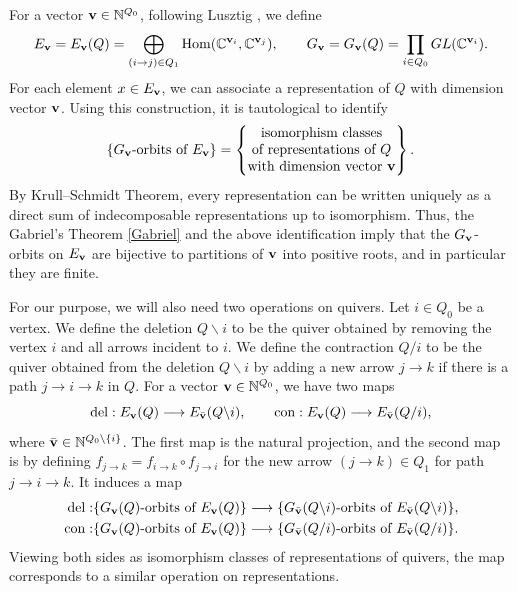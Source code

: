 \documentclass[12pt,reqno]{amsart}
\numberwithin{equation}{section}
\theoremstyle{definition}
\begin{document}
For a vector $\mathbf{v}\in\mathbb{N}^{Q_0}$, following Lusztig \cite[Chapter 9]{Lus}, we define 
$$E_{\mathbf{v}}= E_{\mathbf{v}}(Q)= \bigoplus_{(i\to j)\in Q_1}
\operatorname{Hom}(\mathbb{C}^{\mathbf{v}_{i}},\mathbb{C}^{\mathbf{v}_{j}}),\qquad 
G_{\mathbf{v}} =G_{\mathbf{v}}(Q)= \prod_{i\in Q_0}GL(\mathbb{C}^{\mathbf{v}_i}). $$
For each element $x\in E_{\mathbf{v}}$, we can associate a representation of $Q$ with dimension vector $\mathbf{v}$. Using this construction, it is tautological to identify
$$\{\text{$G_{\mathbf{v}}$-orbits of $E_{\mathbf{v}}$}\}
=\left\{
\begin{matrix}
\text{isomorphism classes}\\
\text{of representations of $Q$}\\
\text{with dimension vector $\mathbf{v}$}
\end{matrix}\right\}.$$
By Krull--Schmidt Theorem, every representation can be written uniquely as a direct sum of indecomposable representations up to isomorphism. 
Thus, the Gabriel's Theorem \ref{Gabriel} and the above identification imply that the $G_{\mathbf{v}}$-orbits on $E_{\mathbf{v}}$ are bijective to partitions of $\mathbf{v}$ into positive roots, and in particular they are finite. 


For our purpose, we will also need two operations on quivers. 
Let $i\in Q_0$ be a vertex. 
We define the deletion $Q\backslash i$ to be the quiver obtained by removing the vertex $i$ and all arrows incident to $i$. 
We define the contraction $Q/i$ to be the quiver obtained from the deletion $Q\backslash i$ by adding a new arrow $j\to k$ if there is a path $j\to i\to k$ in $Q$. 
For a vector $\mathbf{v}\in \mathbb{N}^{Q_0}$, we have two maps 
$$
\operatorname{del}: E_{\mathbf{v}}(Q) \longrightarrow E_{\bar{\mathbf{v}}}({Q\backslash i}),\qquad 
\operatorname{con}: E_{\mathbf{v}}(Q) \longrightarrow E_{\bar{\mathbf{v}}}({Q/i}),
$$
where $\bar{\mathbf{v}}\in \mathbb{N}^{Q_0\setminus \{i\}}$. 
The first map is the natural projection, and the second map is by defining $f_{j\to k}=f_{i\to k}\circ f_{j\to i}$ for the new arrow $(j\to k)\in Q_1$ for path $j\to i \to k$. 
It induces a map 
$$\begin{aligned}
\operatorname{del}: & 
\{\text{$G_{\mathbf{v}}(Q)$-orbits of $E_{\mathbf{v}}(Q)$}\}
\longrightarrow 
\{\text{$G_{\bar{\mathbf{v}}}(Q\backslash i)$-orbits of $E_{\bar{\mathbf{v}}}(Q\backslash i)$}\},\\
\operatorname{con}: & 
\{\text{$G_{\mathbf{v}}(Q)$-orbits of $E_{\mathbf{v}}(Q)$}\}
\longrightarrow 
\{\text{$G_{\bar{\mathbf{v}}}(Q/ i)$-orbits of $E_{\bar{\mathbf{v}}}(Q/ i)$}\}.
\end{aligned}$$
Viewing both sides as isomorphism classes of representations of quivers, the map corresponds to a similar operation on representations. 
\end{document}
